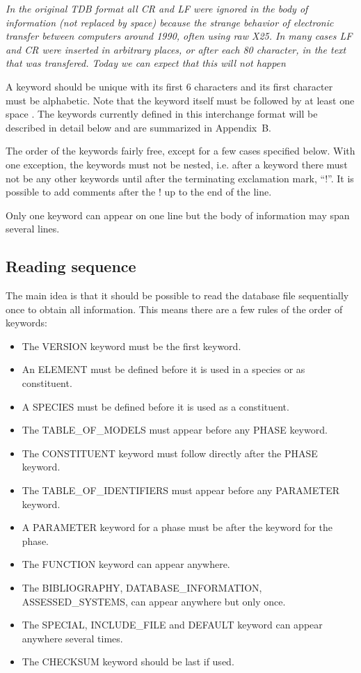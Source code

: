 \documentclass[12pt]{article}
\begin{document}
{\em In the original TDB format all CR and LF were ignored in the body
  of information (not replaced by space) because the strange behavior
  of electronic transfer between computers around 1990, often using
  raw X25.  In many cases LF and CR were inserted in arbitrary places,
  or after each 80 character, in the text that was transfered.  Today
  we can expect that this will not happen}

A keyword should be unique with its first 6 characters and its first
character must be alphabetic.  Note that the keyword itself must be
followed by at least one space .  The keywords currently defined in
this interchange format will be described in detail below and are
summarized in Appendix~B.

The order of the keywords fairly free, except for a few cases
specified below.  With one exception, the keywords must not be nested,
i.e.  after a keyword there must not be any other keywords until after
the terminating exclamation mark, ``!''.  It is possible to add
comments after the ! up to the end of the line.

Only one keyword can appear on one line but the body of information
may span several lines.

\subsection{Reading sequence}

The main idea is that it should be possible to read the database file
sequentially once to obtain all information.  This means there are a
few rules of the order of keywords:
\begin{itemize}
\item The VERSION keyword must be the first keyword.
\item An ELEMENT must be defined before it is used in a species or as
constituent.
\item A SPECIES must be defined before it is used as a constituent.
\item The TABLE\_OF\_MODELS must appear before any PHASE keyword.
\item The CONSTITUENT keyword must follow directly after the PHASE
  keyword.
\item The TABLE\_OF\_IDENTIFIERS must appear before any PARAMETER
  keyword.
\item A PARAMETER keyword for a phase must be after the keyword for
  the phase.
\item The FUNCTION keyword can appear anywhere.
\item The BIBLIOGRAPHY, DATABASE\_INFORMATION, 
  ASSESSED\_SYSTEMS, can appear anywhere but only once.
\item The SPECIAL, INCLUDE\_FILE and DEFAULT keyword can appear
  anywhere several times.
\item The CHECKSUM keyword should be last if used.
\end{itemize}
\end{document}
